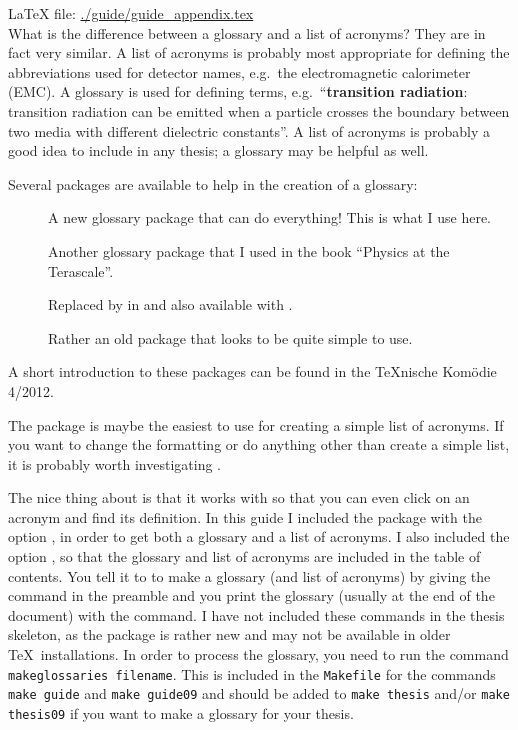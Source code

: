 \LaTeX{} file: \url{./guide/guide_appendix.tex}\\[1ex]
\noindent
What is the difference between a glossary and a list of acronyms? They
are in fact very similar. A list of acronyms is probably most
appropriate for defining the abbreviations used for detector names,
e.g.\ the electromagnetic calorimeter (EMC). A glossary is used for
defining terms, e.g.\ \enquote{\textbf{transition radiation}: transition
radiation can be emitted when a particle crosses the boundary between
two media with different dielectric constants}. A list of acronyms is
probably a good idea to include in any thesis; a glossary may be
helpful as well.

Several packages are available to help in the creation of a glossary:
\begin{description}
\item[] A new glossary package that can do
  everything! This is what I use here.
\item[] Another glossary package that I used in the book
  \enquote{Physics at the Terascale}.
\item[] Replaced by  in
   and also available with .
\item[] Rather an old package that looks to be quite
  simple to use.
\end{description}

A short introduction to these packages can be found in the \TeX nische
Komödie 4/2012.

The  package is maybe the easiest to use for creating
a simple list of acronyms. If you want to change the formatting or do
anything other than create a simple list, it is probably worth
investigating .

The nice thing about  is that it works with
 so that you can even click on an acronym and find
its definition. In this guide I included the package with the option
, in order to get both a glossary and a list of
acronyms. I also included the option , so that the
glossary and list of acronyms are included in the table of
contents. You tell it to to make a glossary (and list of acronyms) by
giving the command  in the preamble and you
print the glossary (usually at the end of the document) with the
 command. I have not included these commands in
the thesis skeleton, as the  package is rather new
and may not be available in older \TeX\ installations. In order to
process the glossary, you need to run the command
\texttt{makeglossaries filename}. This is included in the
\texttt{Makefile} for the commands \texttt{make guide} and
\texttt{make guide09} and should be added to \texttt{make thesis}
and/or \texttt{make thesis09} if you want to make a glossary for your
thesis.

